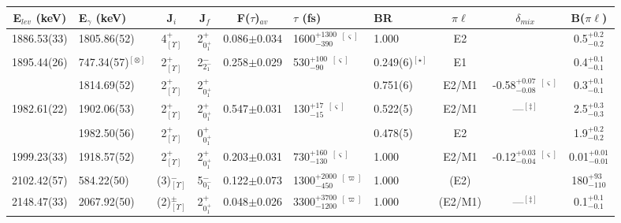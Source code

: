 \begin{landscape}
\begin{center}
\begin{longtable}{clcccllccc}
E$_{lev}$ (keV) & E$_\gamma$ (keV)        & J$_i$              & J$_f$        & F($\tau$)$_{av}$ & $\tau$ (fs)                           & BR        & $\pi\ell$ & $\delta_{mix}$      & B($\pi\ell$) \\ \hline \hline \endhead
 1886.53(33)&  1805.86(52)               & 4$^+_{[\Upsilon]}$ & 2$^+_{0^+_1}$ &0.086$\pm$0.034& 1600$^{+1300}_{-390}$ $^{[\varsigma]}$          &1.000                & E2    &                                      & 0.5$^{+0.2}_{-0.2}$        \\ \hline
 1895.44(26)&   747.34(57)$^{[\otimes]}$ & 2$^+_{[\Upsilon]}$ & 2$^-_{2^-_1}$ &0.258$\pm$0.029& 530$^{+100}_{-90}$ $^{[\varsigma]}$             &0.249(6)$^{[\star]}$& E1    &                                      & 0.4$^{+0.1}_{-0.1}$        \\
            &  1814.69(52)               & 2$^+_{[\Upsilon]}$ & 2$^+_{0^+_1}$ &&                                                            &0.751(6)             & E2/M1 & -0.58$^{+0.07}_{-0.08}$ $^{[\varsigma]}$ & 0.3$^{+0.1}_{-0.1}$        \\ \hline
 1982.61(22)&  1902.06(53)               & 2$^+_{[\Upsilon]}$ & 2$^+_{0^+_1}$ &0.547$\pm$0.031& 130$^{+17}_{-15}$ $^{[\varsigma]}$              &0.522(5)             & E2/M1 & ---$^{[\ddagger]}$                       & 2.5$^{+0.3}_{-0.3}$        \\
            &  1982.50(56)               & 2$^+_{[\Upsilon]}$ & 0$^+_{0^+_1}$ &&                                                            &0.478(5)             & E2    &                                          & 1.9$^{+0.2}_{-0.2}$        \\ \hline
 1999.23(33)&  1918.57(52)               & 2$^+_{[\Upsilon]}$ & 2$^+_{0^+_1}$ &0.203$\pm$0.031& 730$^{+160}_{-130}$ $^{[\varsigma]}$            &1.000                & E2/M1 & -0.12$^{+0.03}_{-0.04}$ $^{[\varsigma]}$     & 0.01$^{+0.01}_{-0.01}$        \\ \hline
 2102.42(57)&   584.22(50)               & (3)$^-_{[\Upsilon]}$&5$^-_{0^-_1}$ &0.122$\pm$0.073& 1300$^{+2000}_{-450}$ $^{[\varpi]}$        &1.000                & (E2)  &                                          & 180$^{+93}_{-110}$   \\ \hline
 2148.47(33)&  2067.92(50)               & (2)$^\pm_{[\Upsilon]}$ & 2$^+_{0^+_1}$         &0.048$\pm$0.026& 3300$^{+3700}_{-1200}$ $^{[\varpi]}$&1.000           &(E2/M1)& ---$^{[\ddagger]}$                       & 0.1$^{+0.1}_{-0.1}$ \\ \hline 

\end{longtable}
\end{center}
\end{landscape}
